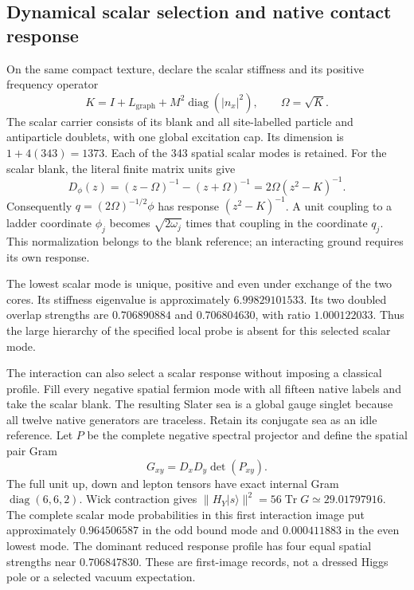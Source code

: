 \subsection{Dynamical scalar selection and native contact response}

On the same compact texture, declare the scalar stiffness and its positive
frequency operator
\[
 K=I+L_{\mathrm{graph}}+M^2\operatorname{diag}(|n_x|^2),
 \qquad \Omega=\sqrt K.
\]
The scalar carrier consists of its blank and all site-labelled particle
and antiparticle doublets, with one global excitation cap. Its dimension
is $1+4(343)=1373$. Each of the 343 spatial scalar modes is retained.
For the scalar blank, the literal finite matrix units give
\[
 D_\phi(z)=(z-\Omega)^{-1}-(z+\Omega)^{-1}
          =2\Omega(z^2-K)^{-1}.
\]
Consequently $q=(2\Omega)^{-1/2}\phi$ has response $(z^2-K)^{-1}$.
A unit coupling to a ladder coordinate $\phi_j$ becomes
$\sqrt{2\omega_j}$ times that coupling in the coordinate $q_j$.
This normalization belongs to the blank reference; an interacting ground
requires its own response.

The lowest scalar mode is unique, positive and even under exchange of the
two cores. Its stiffness eigenvalue is approximately $6.99829101533$.
Its two doubled overlap strengths are $0.706890884$ and $0.706804630$,
with ratio $1.000122033$. Thus the large hierarchy of the specified local
probe is absent for this selected scalar mode.

The interaction can also select a scalar response without imposing a
classical profile. Fill every negative spatial fermion mode with all
fifteen native labels and take the scalar blank. The resulting Slater sea
is a global gauge singlet because all twelve native generators are
traceless. Retain its conjugate sea as an idle reference. Let $P$ be the
complete negative spectral projector and define the spatial pair Gram
\[
 G_{xy}=D_xD_y\det(P_{xy}).
\]
The full unit up, down and lepton tensors have exact internal Gram
$\operatorname{diag}(6,6,2)$. Wick contraction gives
$\|H_Y|s\rangle\|^2=56\operatorname{Tr}G\simeq29.01797916$.
The complete scalar mode probabilities in this first interaction image
put approximately $0.964506587$ in the odd bound mode and $0.000411883$
in the even lowest mode. The dominant reduced response profile has four
equal spatial strengths near $0.706847830$. These are first-image records,
not a dressed Higgs pole or a selected vacuum expectation.


